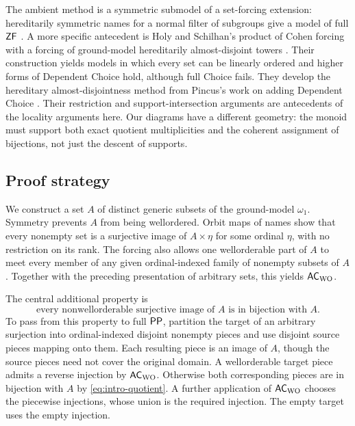 The ambient method is a symmetric submodel of a set-forcing
extension: hereditarily symmetric names for a normal filter of
subgroups give a model of full $\mathsf{ZF}$
\cite[Section~2.1]{Karagila2026}. A more specific antecedent is
Holy and Schilhan's product of Cohen forcing with a forcing of
ground-model hereditarily almost-disjoint towers
\cite[Section~3]{HolySchilhan2025}. Their construction yields
models in which every set can be linearly ordered and higher forms
of Dependent Choice hold, although full Choice fails. They develop
the hereditary almost-disjointness method from Pincus's work on
adding Dependent Choice \cite{Pincus1977}. Their restriction and
support-intersection arguments
\cite[Lemmas~10 and~15]{HolySchilhan2025} are antecedents of the
locality arguments here. Our diagrams have a different geometry:
the monoid must support both exact quotient multiplicities and the
coherent assignment of bijections, not just the descent of supports.

\subsection{Proof strategy}

We construct a set $A$ of distinct generic subsets of the ground-model
$\omega_1$. Symmetry
prevents $A$ from being wellordered. Orbit maps of names show that every
nonempty set is a surjective image of $A\times\eta$ for some ordinal
$\eta$, with no restriction on its rank. The forcing also allows one
wellorderable part of $A$ to meet every member of any given ordinal-indexed
family of nonempty subsets of $A$. Together with the preceding
presentation of arbitrary sets, this yields $\mathsf{AC}_{\mathrm{WO}}$.

The central additional property is
\begin{equation}\label{eq:intro-quotient}
 \text{every nonwellorderable surjective image of $A$ is in bijection with $A$.}
\end{equation}
To pass from this property to full $\mathsf{PP}$, partition the target of an
arbitrary surjection into ordinal-indexed disjoint nonempty pieces and
use disjoint source pieces mapping onto them. Each resulting piece is
an image of $A$, though the source pieces need not cover the original
domain. A wellorderable target piece admits a reverse injection by
$\mathsf{AC}_{\mathrm{WO}}$. Otherwise both corresponding pieces are in bijection with $A$
by \eqref{eq:intro-quotient}. A further application of $\mathsf{AC}_{\mathrm{WO}}$ chooses
the piecewise injections, whose union is the required injection. The
empty target uses the empty injection.

